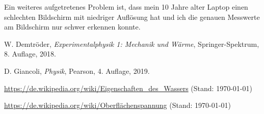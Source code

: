 \documentclass{article}
\begin{document}
Ein weiteres aufgetretenes Problem ist, dass mein 10 Jahre alter Laptop einen schlechten Bildschirm mit niedriger Auflösung hat und ich die genauen Messwerte am Bildschirm nur schwer erkennen konnte.

\begin{thebibliography}{9}
 W. Demtröder, \emph{Experimentalphysik 1: Mechanik und Wärme}, Springer-Spektrum, 8. Auflage, 2018.

 D. Giancoli, \emph{Physik}, Pearson, 4. Auflage, 2019.

 \url{https://de.wikipedia.org/wiki/Eigenschaften_des_Wassers} (Stand: \today) 


 \url{https://de.wikipedia.org/wiki/Oberflächenspannung} (Stand: \today) 
\end{thebibliography}
\end{document}
